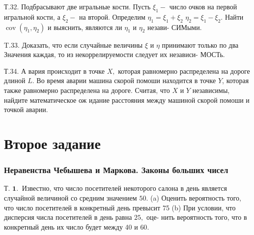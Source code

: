 \documentclass[a4paper,12pt]{article} %
\begin{document}
\begin{example}


Т.32. Подбрасывают две игральные кости. Пусть $\xi_{1}-$ число очков на первой игральной кости, а $\xi_{2}-$ на второй. Определим $\eta_{1}=\xi_{1}+\xi_{2}$ $\eta_{2}=\xi_{1}-\xi_{2} .$ Найти $\operatorname{cov}\left(\eta_{1}, \eta_{2}\right)$ и выяснить, являются ли $\eta_{1}$ и $\eta_{2}$ незави-
СИМыми.



\end{example}



\begin{example}

T.33. Доказать, что если случайные величины $\xi$ и $\eta$ принимают только
по два Значения каждая, то из некоррелируемости следует их независи-
МОСТь.




\end{example}





\begin{example}


Т.34. А вария происходит в точке $X,$ которая равномерно распределена на дороге длиной $L .$ Во время аварии машина скорой помоши находится в точке $Y$, которая также равномерно распределена на дороге. Считая,
что $X$ и $Y$ независимы, найдите математическое ож идание расстояния между машиной скорой помоши и точкой аварии.



\end{example}







\clearpage
\part{Второе задание}


\section{Неравенства Чебышева и Маркова. Законы больших чисел}

\begin{example}

Т. $\mathbf{1 . ~}$ Известно, что число посетителей некоторого салона в день является случайной величиной со средним значением $50 .$
(a) Оценить вероятность того, что число посетителей в конкретный день превысит 75
(b) При условии, что дисперсия числа посетителей в день равна $25,$ оце-
нить вероятность того, что в конкретный день их число будет между 40 и $60 .$




\end{example}
\end{document}
